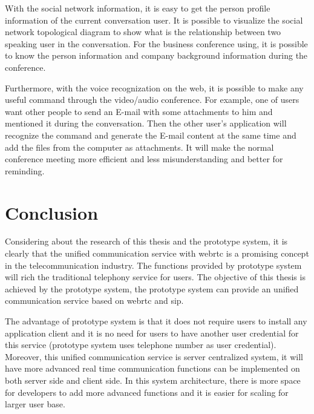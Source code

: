 \par With the social network information, it is easy to get the person profile information of the current conversation user. It is possible to visualize the social network topological diagram to show what is the relationship between two speaking user in the conversation. For the business conference using, it is possible to know the person information and company background information during the conference.

\par Furthermore, with the voice recognization on the web, it is possible to make any useful command through the video/audio conference. For example, one of users want other people to send an E-mail with some attachments to him and mentioned it during the conversation. Then the other user's application will recognize the command and generate the E-mail content at the same time and add the files from the computer as attachments. It will make the normal conference meeting more efficient and less misunderstanding and better for reminding.

\section{Conclusion}

\par Considering about the research of this thesis and the prototype system, it is clearly that the unified communication service with \gls{webrtc} is a promising concept in the telecommunication industry. The functions provided by prototype system will rich the traditional telephony service for users. The objective of this thesis is achieved by the prototype system, the prototype system can provide an unified communication service based on \gls{webrtc} and \gls{sip}.

\par The advantage of prototype system is that it does not require users to install any application client and it is no need for users to have another user credential for this service (prototype system uses telephone number as user credential). Moreover, this unified communication service is server centralized system, it will have more advanced real time communication functions can be implemented on both server side and client side. In this system architecture, there is more space for developers to add more advanced functions and it is easier for scaling for larger user base.

